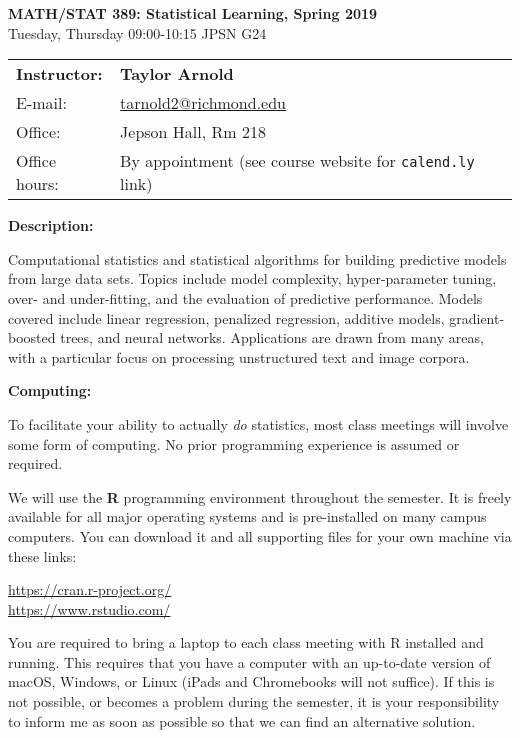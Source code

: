 \documentclass[12pt]{article}
\begin{document}
\begin{center}
{\bf MATH/STAT 389: Statistical Learning, Spring 2019} \\
Tuesday, Thursday 09:00-10:15 \quad JPSN G24
\end{center}

\bigskip

\noindent
\begin{tabular}{ l l }
{\bf Instructor:} &  {\bf Taylor Arnold} \\
E-mail: & \href{mailto:tarnold2@richmond.edu}{tarnold2@richmond.edu} \\
Office: & Jepson Hall, Rm 218 \\
Office hours: & By appointment (see course website for \texttt{calend.ly} link)
\end{tabular}

\vspace{0.5cm}

\textbf{Description:} \vspace{6pt}

Computational statistics and statistical algorithms for building predictive
models from large data sets. Topics include model complexity, hyper-parameter
tuning, over- and under-fitting, and the evaluation of predictive performance.
Models covered include linear regression, penalized regression, additive
models, gradient-boosted trees, and neural networks. Applications are drawn
from many areas, with a particular focus on processing unstructured text and
image corpora.

\bigskip

\textbf{Computing:} \vspace{6pt}

To facilitate your ability to actually \textit{do} statistics, most class
meetings will involve some form of computing. No prior programming experience
is assumed or required.

\medskip

We will use the \textbf{R} programming environment throughout the
semester. It is freely available for all major operating systems and
is pre-installed on many campus computers. You can download it and
all supporting files for your own machine via these links:
\begin{center}
\url{https://cran.r-project.org/} \\
\url{https://www.rstudio.com/}
\end{center}
You are required to bring a laptop to each class meeting with R installed
and running. This requires that you have a computer with an up-to-date
version of macOS, Windows, or Linux (iPads and Chromebooks will not suffice).
If this is not possible, or becomes a problem during the semester, it is your
responsibility to inform me as soon as possible so that we can find an
alternative solution.
\end{document}
